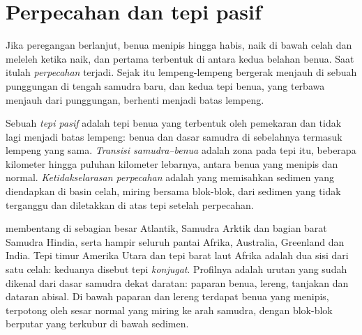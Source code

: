 \section{Perpecahan dan tepi pasif}

Jika peregangan berlanjut,  benua menipis hingga habis,  naik di bawah celah dan meleleh ketika naik, dan  pertama terbentuk di antara kedua belahan benua. Saat itulah \emph{perpecahan} terjadi. Sejak itu lempeng-lempeng bergerak menjauh di sebuah punggungan di tengah samudra baru, dan kedua tepi benua, yang terbawa menjauh dari punggungan, berhenti menjadi batas lempeng.

\begin{definition}\label{def:b1:rifts-ridges-margins:passive-margin}
Sebuah \emph{tepi pasif} adalah tepi benua yang terbentuk oleh pemekaran dan tidak lagi menjadi batas lempeng: benua dan dasar samudra di sebelahnya termasuk lempeng yang sama. \emph{Transisi samudra--benua} adalah zona pada tepi itu, beberapa kilometer hingga puluhan kilometer lebarnya, antara  benua yang menipis dan  normal. \emph{Ketidakselarasan perpecahan} adalah  yang memisahkan sedimen yang diendapkan di basin celah, miring bersama blok-blok, dari sedimen yang tidak terganggu dan diletakkan di atas tepi setelah perpecahan.
\end{definition}

 membentang di sebagian besar Atlantik, Samudra Arktik dan bagian barat Samudra Hindia, serta hampir seluruh pantai Afrika, Australia, Greenland dan India. Tepi timur Amerika Utara dan tepi barat laut Afrika adalah dua sisi dari satu celah: keduanya disebut tepi \emph{konjugat}. Profilnya adalah urutan yang sudah dikenal dari dasar samudra dekat daratan: paparan benua, lereng, tanjakan dan dataran abisal. Di bawah paparan dan lereng terdapat  benua yang menipis, terpotong oleh sesar normal yang miring ke arah samudra, dengan blok-blok berputar yang terkubur di bawah sedimen.

